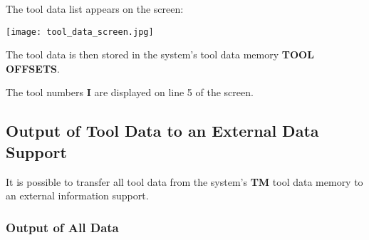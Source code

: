 \vspace{.5cm}

\begin{itemize}
\end{itemize}
\vspace{.5cm}
The tool data list appears on the screen:

\begin{center}
    \texttt{[image: tool\_data\_screen.jpg]}
\end{center}

\begin{itemize}
\end{itemize}

\vspace{.5cm}

\begin{itemize}
\end{itemize}

The tool data is then stored in the system's tool data memory \textbf{TOOL OFFSETS}.

The tool numbers \textbf{I} are displayed on line 5 of the screen.

\newpage

\subsection{Output of Tool Data to an External Data Support}

It is possible to transfer all tool data from the system’s \textbf{TM} tool data memory to an external information support.

\subsubsection{Output of All Data}

\begin{itemize}
\end{itemize}

\vspace{.5cm}

\begin{itemize}
\end{itemize}

